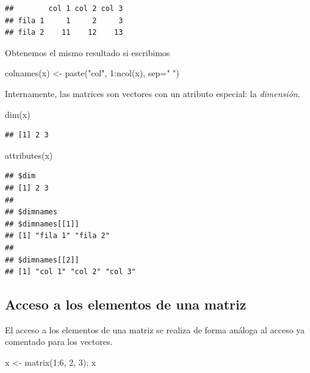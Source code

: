\documentclass[
]{book}
\newenvironment{Shaded}{\begin{snugshade}}{\end{snugshade}}
\newcommand{\AttributeTok}[1]{\textcolor[rgb]{0.77,0.63,0.00}{#1}}
\newcommand{\DecValTok}[1]{\textcolor[rgb]{0.00,0.00,0.81}{#1}}
\newcommand{\FunctionTok}[1]{\textcolor[rgb]{0.00,0.00,0.00}{#1}}
\newcommand{\NormalTok}[1]{#1}
\newcommand{\OtherTok}[1]{\textcolor[rgb]{0.56,0.35,0.01}{#1}}
\newcommand{\SpecialCharTok}[1]{\textcolor[rgb]{0.00,0.00,0.00}{#1}}
\newcommand{\StringTok}[1]{\textcolor[rgb]{0.31,0.60,0.02}{#1}}
\theoremstyle{break}
\theoremstyle{nonumberplain}
\begin{document}
\begin{verbatim}
##        col 1 col 2 col 3
## fila 1     1     2     3
## fila 2    11    12    13
\end{verbatim}

Obtenemos el mismo resultado si escribimos

\begin{Shaded}
\begin{Highlighting}[]
\FunctionTok{colnames}\NormalTok{(x) }\OtherTok{\textless{}{-}} \FunctionTok{paste}\NormalTok{(}\StringTok{"col"}\NormalTok{, }\DecValTok{1}\SpecialCharTok{:}\FunctionTok{ncol}\NormalTok{(x), }\AttributeTok{sep=}\StringTok{" "}\NormalTok{)}
\end{Highlighting}
\end{Shaded}

Internamente, las matrices son vectores con un atributo especial: la \emph{dimensión}.

\begin{Shaded}
\begin{Highlighting}[]
\FunctionTok{dim}\NormalTok{(x)}
\end{Highlighting}
\end{Shaded}

\begin{verbatim}
## [1] 2 3
\end{verbatim}

\begin{Shaded}
\begin{Highlighting}[]
\FunctionTok{attributes}\NormalTok{(x)}
\end{Highlighting}
\end{Shaded}

\begin{verbatim}
## $dim
## [1] 2 3
## 
## $dimnames
## $dimnames[[1]]
## [1] "fila 1" "fila 2"
## 
## $dimnames[[2]]
## [1] "col 1" "col 2" "col 3"
\end{verbatim}

\hypertarget{acceso-a-los-elementos-de-una-matriz}{%
\subsection{Acceso a los elementos de una matriz}\label{acceso-a-los-elementos-de-una-matriz}}

El acceso a los elementos de una matriz se realiza de forma análoga al acceso ya comentado para los vectores.

\begin{Shaded}
\begin{Highlighting}[]
\NormalTok{x }\OtherTok{\textless{}{-}} \FunctionTok{matrix}\NormalTok{(}\DecValTok{1}\SpecialCharTok{:}\DecValTok{6}\NormalTok{, }\DecValTok{2}\NormalTok{, }\DecValTok{3}\NormalTok{); x}
\end{Highlighting}
\end{Shaded}
\end{document}
